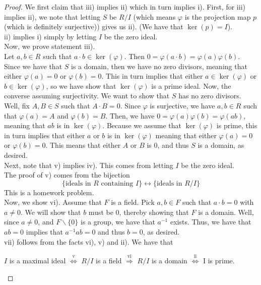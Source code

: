 \documentclass{amsart}
\theoremstyle{definition}
\theoremstyle{remark}
\begin{document}
\begin{proof}
    We first claim that iii) implies ii) which in turn implies i). First, for iii) implies
    ii), we note that letting $S$ be $R / I$ (which means $\varphi$ is the projection
    map $p$ (which is definitely surjective)) gives us ii). (We have that $\ker(p) = I$).\\
    ii) implies i) simply by letting $I$ be the zero ideal. \\
    Now, we prove statement iii). \\
    Let $a, b \in R$ such that $a \cdot b \in \ker(\varphi)$. Then $0 = \varphi(a \cdot b) = \varphi(a)\varphi(b)$.
    Since we have that $S$ is a domain, then we have no zero divisors, meaning that either
    $\varphi(a) = 0$ or $\varphi(b) = 0$. This in turn implies that either $a \in \ker(\varphi)$ or $b \in \ker(\varphi)$,
    so we have show that $\ker(\varphi)$ is a prime ideal. Now, the converse assuming surjectivity.
    We want to show that $S$ has no zero divisors. Well, fix $A,B \in S$ such that $A \cdot B = 0$.
    Since $\varphi$ is surjective, we have $a, b \in R$ such that $\varphi(a) = A$ and $\varphi(b) = B$.
    Then, we have $0 = \varphi(a)\varphi(b) = \varphi(ab)$, meaning that $ab$ is in $\ker(\varphi)$.
    Because we assume that $\ker(\varphi)$ is prime, this in turn implies that either
    $a$ or $b$ is in $\ker(\varphi)$ meaning that either $\varphi(a) = 0$ or $\varphi(b) = 0$.
    This means that either $A$ or $B$ is 0, and thus $S$ is a domain, as desired. \\
    Next, note that v) implies iv). This comes from letting $I$ be the zero ideal. \\
    The proof of v) comes from the bijection
    $$
    \{\textrm{ideals in $R$ containing $I$}\} \leftrightarrow \{\textrm{ideals in $R/I$}\}
    $$
    This is a homework problem. \\
    Now, we show vi). Assume that $F$ is a field. Pick $a,b \in F$ such that $a \cdot b = 0$
    with $a \neq 0$. We will show that $b$ must be 0, thereby showing that $F$ is a domain.
    Well, since $a \neq 0$, and $F \backslash \{0\}$ is a group, we have that $a^{-1}$ exists.
    Thus, we have that $ab = 0$ implies that $a^{-1}ab = 0$ and thus $b = 0$, as desired. \\
    vii) follows from the facts vi), v) and ii). We have that
    \begin{center}
        $I$ is a maximal ideal $\overset{\textrm{v}}{\iff}$ $R/I$ is a field $\overset{\textrm{vi}}{\Rightarrow}$ $R / I$ is a domain
        $\overset{\textrm{ii}}{\iff}$ I is prime.
    \end{center}
\end{proof}
\end{document}
